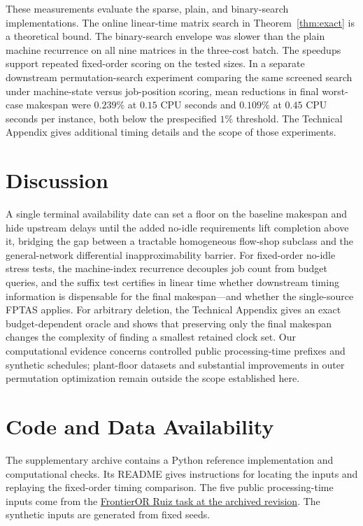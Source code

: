\documentclass[11pt,letterpaper]{article}
\begin{document}
These measurements evaluate the sparse, plain, and binary-search implementations. The online linear-time matrix search in Theorem~\ref{thm:exact} is a theoretical bound. The binary-search envelope was slower than the plain machine recurrence on all nine matrices in the three-cost batch. The speedups support repeated fixed-order scoring on the tested sizes. In a separate downstream permutation-search experiment comparing the same screened search under machine-state versus job-position scoring, mean reductions in final worst-case makespan were $0.239\%$ at $0.15$ CPU seconds and $0.109\%$ at $0.45$ CPU seconds per instance, both below the prespecified $1\%$ threshold. The Technical Appendix gives additional timing details and the scope of those experiments.

\section{Discussion}
\label{sec:discussion}

A single terminal availability date can set a floor on the baseline makespan and hide upstream delays until the added no-idle requirements lift completion above it, bridging the gap between a tractable homogeneous flow-shop subclass and the general-network differential inapproximability barrier. For fixed-order no-idle stress tests, the machine-index recurrence decouples job count from budget queries, and the suffix test certifies in linear time whether downstream timing information is dispensable for the final makespan---and whether the single-source FPTAS applies. For arbitrary deletion, the Technical Appendix gives an exact budget-dependent oracle and shows that preserving only the final makespan changes the complexity of finding a smallest retained clock set. Our computational evidence concerns controlled public processing-time prefixes and synthetic schedules; plant-floor datasets and substantial improvements in outer permutation optimization remain outside the scope established here.

\section*{Code and Data Availability}

The supplementary archive contains a Python reference implementation and computational checks. Its README gives instructions for locating the inputs and replaying the fixed-order timing comparison. The five public processing-time inputs come from the \href{https://huggingface.co/datasets/frontieror/FrontierOR/tree/ef42a2eac13595453f986d9df0b62e86e75ab596/tasks/ruiz2007}{FrontierOR Ruiz task at the archived revision}. The synthetic inputs are generated from fixed seeds.
\end{document}
